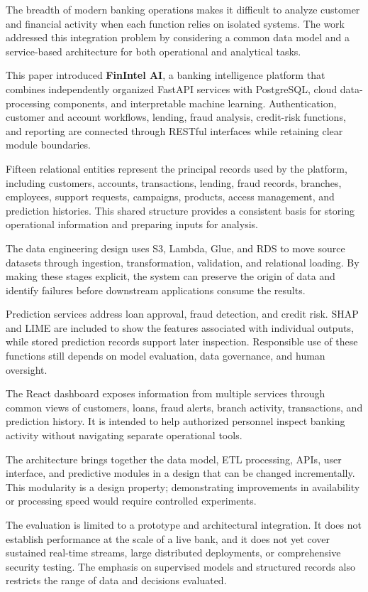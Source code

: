 \documentclass[conference]{IEEEtran}
\begin{document}
The breadth of modern banking operations makes it difficult to analyze customer and financial activity when each function relies on isolated systems. The work addressed this integration problem by considering a common data model and a service-based architecture for both operational and analytical tasks.

This paper introduced \textbf{FinIntel AI}, a banking intelligence platform that combines independently organized FastAPI services with PostgreSQL, cloud data-processing components, and interpretable machine learning. Authentication, customer and account workflows, lending, fraud analysis, credit-risk functions, and reporting are connected through RESTful interfaces while retaining clear module boundaries.

Fifteen relational entities represent the principal records used by the platform, including customers, accounts, transactions, lending, fraud records, branches, employees, support requests, campaigns, products, access management, and prediction histories. This shared structure provides a consistent basis for storing operational information and preparing inputs for analysis.

The data engineering design uses S3, Lambda, Glue, and RDS to move source datasets through ingestion, transformation, validation, and relational loading. By making these stages explicit, the system can preserve the origin of data and identify failures before downstream applications consume the results.

Prediction services address loan approval, fraud detection, and credit risk. SHAP and LIME are included to show the features associated with individual outputs, while stored prediction records support later inspection. Responsible use of these functions still depends on model evaluation, data governance, and human oversight.

The React dashboard exposes information from multiple services through common views of customers, loans, fraud alerts, branch activity, transactions, and prediction history. It is intended to help authorized personnel inspect banking activity without navigating separate operational tools.

The architecture brings together the data model, ETL processing, APIs, user interface, and predictive modules in a design that can be changed incrementally. This modularity is a design property; demonstrating improvements in availability or processing speed would require controlled experiments.

The evaluation is limited to a prototype and architectural integration. It does not establish performance at the scale of a live bank, and it does not yet cover sustained real-time streams, large distributed deployments, or comprehensive security testing. The emphasis on supervised models and structured records also restricts the range of data and decisions evaluated.
\end{document}
